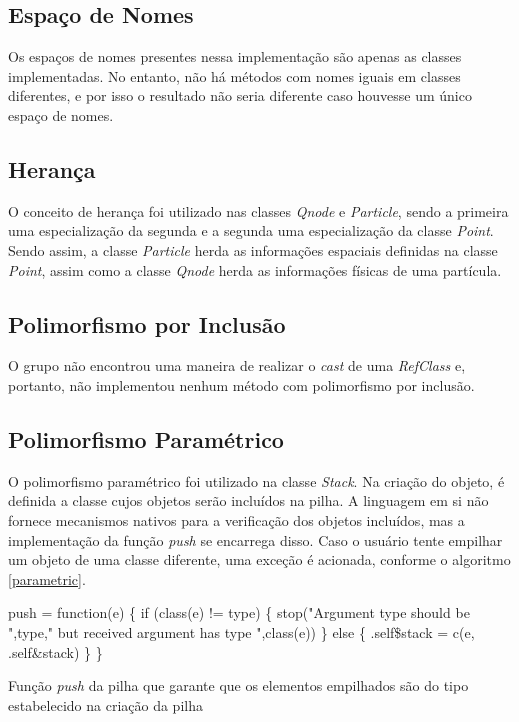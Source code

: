 \documentclass[rel_mlp]{iiufrgs}
\makeatletter
\newcommand{\nosemic}{\renewcommand{\@endalgocfline}{\relax}}%
\makeatother
\begin{document}
\subsection{Espaço de Nomes}

    Os espaços de nomes presentes nessa implementação são apenas as classes implementadas. No entanto,
    não há métodos com nomes iguais em classes diferentes, e por isso o resultado não seria diferente
    caso houvesse um único espaço de nomes.

\subsection{Herança}

    O conceito de herança foi utilizado nas classes \textit{Qnode} e \textit{Particle}, sendo a primeira uma especialização
    da segunda e a segunda uma especialização da classe \textit{Point}. Sendo assim, a classe \textit{Particle} herda as
    informações espaciais definidas na classe \textit{Point}, assim como a classe \textit{Qnode} herda as informações físicas
    de uma partícula.

\subsection{Polimorfismo por Inclusão}

    O grupo não encontrou uma maneira de realizar o \textit{cast} de uma \textit{RefClass} e, portanto,
    não implementou nenhum método com polimorfismo por inclusão.

\subsection{Polimorfismo Paramétrico}

    O polimorfismo paramétrico foi utilizado na classe \textit{Stack}. Na criação do objeto, é definida
    a classe cujos objetos serão incluídos na pilha. A linguagem em si não fornece mecanismos nativos para
    a verificação dos objetos incluídos, mas a implementação da função \textit{push} se encarrega disso. Caso
    o usuário tente empilhar um objeto de uma classe diferente, uma exceção é acionada, conforme o algoritmo
    \ref{parametric}.

    \begin{algorithm}
    \nosemic    push = function(e) {\{}
  if (class(e) != type) {\{}
    stop("Argument type should be ",type," but received argument has type ",class(e))
  {\}} else {\{}
    .self{\$}stack = c(e, .self{\&}stack)
  {\}}
{\}}
\caption{Função \textit{push} da pilha que garante que os elementos empilhados são do tipo estabelecido na criação da pilha}
\end{algorithm}
\end{document}
